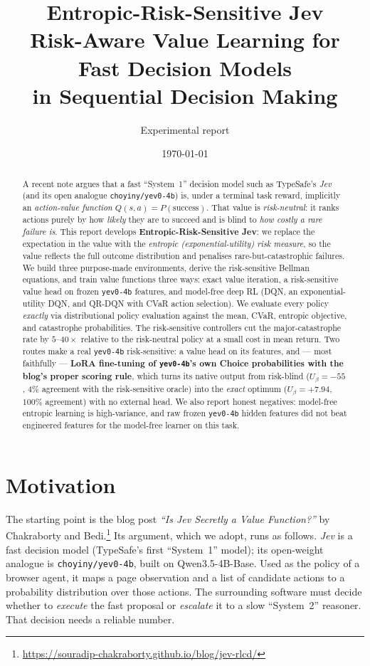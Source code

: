\documentclass[11pt]{article}
\title{\textbf{Entropic-Risk-Sensitive Jev}\\[2mm]
\large Risk-Aware Value Learning for Fast Decision Models\\ in Sequential Decision Making}
\author{Experimental report}
\date{\today}
\newcommand{\Ubeta}{U_{\beta}}
\begin{document}
\maketitle

\begin{abstract}
A recent note argues that a fast ``System~1'' decision model such as
TypeSafe's \emph{Jev} (and its open analogue \texttt{choyiny/yev0-4b}) is, under a
terminal task reward, implicitly an \emph{action-value function}
$Q(s,a)=P(\text{success})$. That value is \emph{risk-neutral}: it ranks actions
purely by how \emph{likely} they are to succeed and is blind to \emph{how costly a
rare failure is}. This report develops \textbf{Entropic-Risk-Sensitive Jev}:
we replace the expectation in the value with the \emph{entropic (exponential-utility)
risk measure}, so the value reflects the full outcome distribution and penalises
rare-but-catastrophic failures. We build three purpose-made environments, derive
the risk-sensitive Bellman equations, and train value functions three ways:
exact value iteration, a risk-sensitive value head on frozen \texttt{yev0-4b}
features, and model-free deep RL (DQN, an exponential-utility DQN, and
QR-DQN with CVaR action selection). We evaluate every policy \emph{exactly} via
distributional policy evaluation against the mean, CVaR, entropic objective, and
catastrophe probabilities. The risk-sensitive controllers cut the major-catastrophe
rate by $5$--$40\times$ relative to the risk-neutral policy at a small cost in
mean return. Two routes make a real \texttt{yev0-4b} risk-sensitive: a value head
on its features, and --- most faithfully --- \textbf{LoRA fine-tuning of
\texttt{yev0-4b}'s own Choice probabilities with the blog's proper scoring rule},
which turns its native output from risk-blind ($\Ubeta=-55$, $4\%$ agreement with
the risk-sensitive oracle) into the \emph{exact} optimum ($\Ubeta=+7.94$, $100\%$
agreement) with no external head. We also report honest negatives: model-free
entropic learning is high-variance, and raw frozen \texttt{yev0-4b} hidden features
did not beat engineered features for the model-free learner on this task.
\end{abstract}

\tableofcontents

\section{Motivation}
The starting point is the blog post \emph{``Is Jev Secretly a Value Function?''}
by Chakraborty and Bedi.\footnote{\url{https://souradip-chakraborty.github.io/blog/jev-rlcd/}}
Its argument, which we adopt, runs as follows. \emph{Jev} is a fast decision model
(TypeSafe's first ``System~1'' model); its open-weight analogue is
\texttt{choyiny/yev0-4b}, built on Qwen3.5-4B-Base. Used as the policy of a browser
agent, it maps a page observation and a list of candidate actions to a probability
distribution over those actions. The surrounding software must decide whether to
\emph{execute} the fast proposal or \emph{escalate} it to a slow ``System~2''
reasoner. That decision needs a reliable number.
\end{document}

